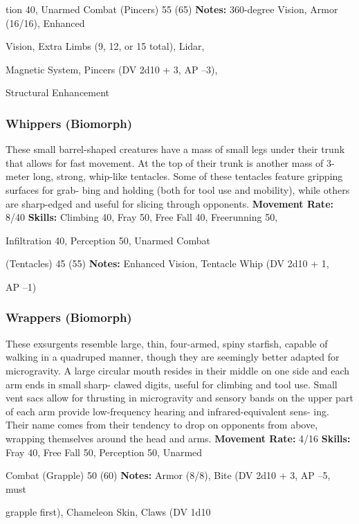 tion 40, Unarmed Combat (Pincers) 55 (65)
\textbf{Notes: }360-degree Vision, Armor (16/16), Enhanced 

Vision, Extra Limbs (9, 12, or 15 total), Lidar, 

Magnetic System, Pincers (DV 2d10 + 3, AP –3), 

Structural Enhancement 

\subsubsection{Whippers (Biomorph)}

These small barrel-shaped creatures have a mass 
of small legs under their trunk that allows for fast 
movement. At the top of their trunk is another mass 
of 3-meter long, strong, whip-like tentacles. Some 
of these tentacles feature gripping surfaces for grab-
bing and holding (both for tool use and mobility), 
while others are sharp-edged and useful for slicing 
through opponents. 
\textbf{Movement Rate:} 8/40
\textbf{Skills:} Climbing 40, Fray 50, Free Fall 40, Freerunning 50, 

Infiltration 40, Perception 50, Unarmed Combat 

(Tentacles) 45 (55)
\textbf{Notes: }Enhanced Vision, Tentacle Whip (DV 2d10 + 1, 

AP –1)

\subsubsection{Wrappers (Biomorph)}

These exsurgents resemble large, thin, four-armed, 
spiny starfish, capable of walking in a quadruped 
manner, though they are seemingly better adapted for 
microgravity. A large circular mouth resides in their 
middle on one side and each arm ends in small sharp-
clawed digits, useful for climbing and tool use. Small 
vent sacs allow for thrusting in microgravity and 
sensory bands on the upper part of each arm provide 
low-frequency hearing and infrared-equivalent sens-
ing. Their name comes from their tendency to drop on 
opponents from above, wrapping themselves around 
the head and arms.
\textbf{Movement Rate:} 4/16
\textbf{Skills:} Fray 40, Free Fall 50, Perception 50, Unarmed 

Combat (Grapple) 50 (60) 
\textbf{Notes: }Armor (8/8), Bite (DV 2d10 + 3, AP –5, must 

grapple first), Chameleon Skin, Claws (DV 1d10 

